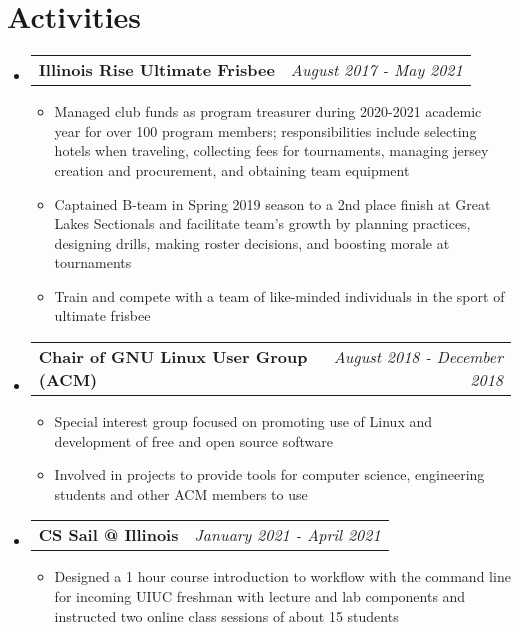 \documentclass[letterpaper,11pt]{article}
\makeatletter
\newcommand{\resumeBullet}[1]
{\item[$\bullet$]\small
	{#1 \vspace{-1pt}
	}
}
\newcommand{\resumeSubheading}[2]
{\vspace{-1pt}\item[]\small
	\begin{tabular*}{0.97\textwidth}{l@{\extracolsep{\fill}}r}
		\textbf{#1} & \textit{\small #2} \\
	\end{tabular*}\vspace{-6pt}
}
\newcommand{\resumeSubHeadingListStart}{\begin{itemize}[leftmargin=*,itemsep=0.2pt]}
\newcommand{\resumeSubHeadingListEnd}{\end{itemize}\vspace{-4pt}}
\newcommand{\resumeItemListStart}{\begin{itemize}[itemsep=0.2pt]}
\newcommand{\resumeItemListEnd}{\end{itemize}\vspace{-4pt}}
\makeatother
\begin{document}
\section{Activities}
  \resumeSubHeadingListStart
  \resumeSubheading
  {Illinois Rise Ultimate Frisbee}{August 2017 - May 2021}
  \resumeItemListStart
  	\resumeBullet
  	{Managed club funds as program treasurer during  2020-2021 academic year for over 100 program members; responsibilities include selecting hotels when traveling, collecting fees for
tournaments, managing jersey creation and procurement, and obtaining team equipment}
  	\resumeBullet
  	{Captained B-team in Spring 2019 season to a 2nd place finish at Great Lakes Sectionals and facilitate team's growth by planning practices, designing drills, making roster decisions, and boosting morale at tournaments}
  	\resumeBullet
  	{Train and compete with a team of like-minded individuals in the sport of ultimate frisbee}
  \resumeItemListEnd
  	\resumeSubheading
  	{Chair of GNU Linux User Group (ACM)}{August 2018 - December 2018}
  	\resumeItemListStart
  		\resumeBullet
  		{Special interest group focused on promoting use of Linux and development of free and open source software}
  		\resumeBullet
  		{Involved in projects to provide tools for computer science, engineering students and other ACM members to use}
  	\resumeItemListEnd
  	\resumeSubheading
  	{CS Sail @ Illinois}{January 2021 - April 2021}
	\resumeItemListStart
  		\resumeBullet
  		{Designed a 1 hour course introduction to workflow with the command line for incoming UIUC freshman with lecture and lab components and instructed two online class sessions of about 15 students}
  	\resumeItemListEnd
  \resumeSubHeadingListEnd
\end{document}
